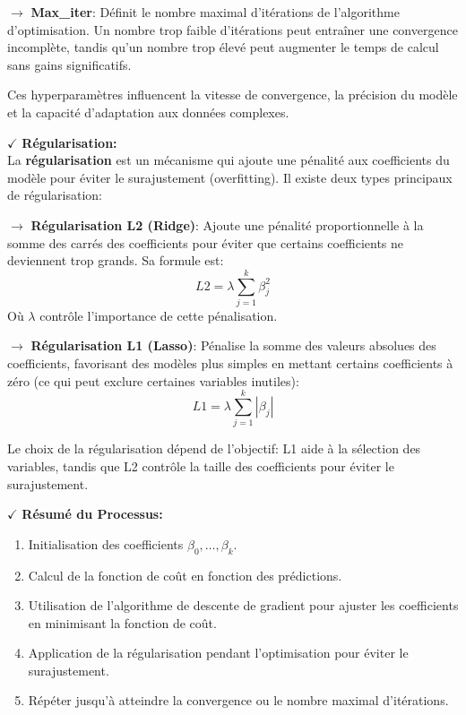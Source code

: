\noindent \textbf{\(\rightarrow\)} \textbf{Max\_iter}: Définit le nombre maximal d'itérations de l'algorithme d'optimisation. Un nombre trop faible d'itérations peut entraîner une convergence incomplète, tandis qu'un nombre trop élevé peut augmenter le temps de calcul sans gains significatifs.

Ces hyperparamètres influencent la vitesse de convergence, la précision du modèle et la capacité d'adaptation aux données complexes.

\textbf{\(\checkmark\)} \textbf{Régularisation:}\\
La \textbf{régularisation} est un mécanisme qui ajoute une pénalité aux coefficients du modèle pour éviter le surajustement (overfitting). Il existe deux types principaux de régularisation:

\noindent \textbf{\(\rightarrow\)} \textbf{Régularisation L2 (Ridge)}: Ajoute une pénalité proportionnelle à la somme des carrés des coefficients pour éviter que certains coefficients ne deviennent trop grands. Sa formule est:
    \[
    L2 = \lambda \sum_{j=1}^{k} \beta_j^2
    \]
    Où \( \lambda \) contrôle l’importance de cette pénalisation.

\noindent \textbf{\(\rightarrow\)} \textbf{Régularisation L1 (Lasso)}: Pénalise la somme des valeurs absolues des coefficients, favorisant des modèles plus simples en mettant certains coefficients à zéro (ce qui peut exclure certaines variables inutiles):
    \[
    L1 = \lambda \sum_{j=1}^{k} |\beta_j|
    \]

Le choix de la régularisation dépend de l'objectif: L1 aide à la sélection des variables, tandis que L2 contrôle la taille des coefficients pour éviter le surajustement.

\textbf{\(\checkmark\)} \textbf{Résumé du Processus:}
\begin{enumerate}
    \item Initialisation des coefficients \( \beta_0, \dots, \beta_k \).
    \item Calcul de la fonction de coût en fonction des prédictions.
    \item Utilisation de l’algorithme de descente de gradient pour ajuster les coefficients en minimisant la fonction de coût.
    \item Application de la régularisation pendant l'optimisation pour éviter le surajustement.
    \item Répéter jusqu'à atteindre la convergence ou le nombre maximal d'itérations.
\end{enumerate}



